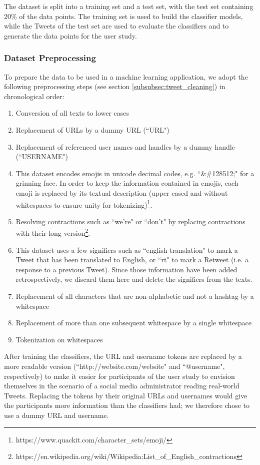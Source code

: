 The dataset is split into a training set and a test set, with the test set containing 20\% of the data points. The training set is used to build the classifier models, while the Tweets of the test set are used to evaluate the classifiers and to generate the data points for the user study.



\subsubsection{Dataset Preprocessing}
To prepare the data to be used in a machine learning application, we adopt the following preprocessing steps (see section \ref{subsubsec:tweet_cleaning}) in chronological order:
\begin{enumerate}
	\item Conversion of all texts to lower cases
	\item Replacement of URLs by a dummy URL (``URL")
	\item Replacement of referenced user names and handles by a dummy handle (``USERNAME")
	\item This dataset encodes emojis in unicode decimal codes, e.g. ``\&\#128512;" for a grinning face. In order to keep the information contained in emojis, each emoji is replaced by its textual description (upper cased and without whitespaces to ensure unity for tokenizing)\footnote{https://www.quackit.com/character\_sets/emoji/}.
	\item Resolving contractions such as ``we're" or ``don't" by replacing contractions with their long version\footnote{https://en.wikipedia.org/wiki/Wikipedia:List\_of\_English\_contractions}.
	\item This dataset uses a few signifiers such as ``english translation" to mark a Tweet that has been translated to English, or ``rt" to mark a Retweet (i.e. a response to a previous Tweet). Since those information have been added retrospectively, we discard them here and delete the signifiers from the texts.
	\item Replacement of all characters that are non-alphabetic and not a hashtag by a whitespace
	\item Replacement of more than one subsequent whitespace by a single whitespace
	\item Tokenization on whitespaces
\end{enumerate}
After training the classifiers, the URL and username tokens are replaced by a more readable version (``http://website.com/website" and ``@username", respectively) to make it easier for participants of the user study to envision themselves in the scenario of a social media administrator reading real-world Tweets. Replacing the tokens by their original URLs and usernames would give the participants more information than the classifiers had; we therefore chose to use a dummy URL and username.\medskip\newline

